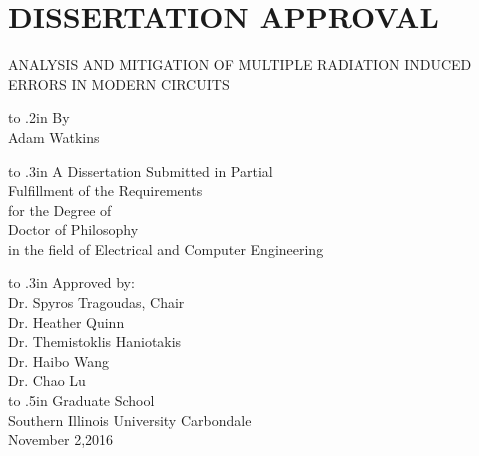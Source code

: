 

\chapter*{DISSERTATION APPROVAL} 


\thispagestyle{empty}

\begin{center}
\medskip
ANALYSIS AND MITIGATION OF MULTIPLE RADIATION INDUCED ERRORS IN MODERN CIRCUITS

\vbox to .2in{}
By \\
Adam Watkins

\vbox to .3in{}
A Dissertation Submitted in Partial \\
Fulfillment of the Requirements \\
for the Degree of \\
Doctor of Philosophy \\
in the field of Electrical and Computer Engineering

\vbox to .3in{}
Approved by: \\
Dr. Spyros Tragoudas, Chair \\
Dr. Heather Quinn \\
Dr. Themistoklis Haniotakis \\
Dr. Haibo Wang \\
Dr. Chao Lu \\

\baselineskip=14pt
\vbox to .5in{}
Graduate School \\
Southern Illinois University Carbondale \\
November 2,2016
\end{center}

\baselineskip=24pt
\newpage

